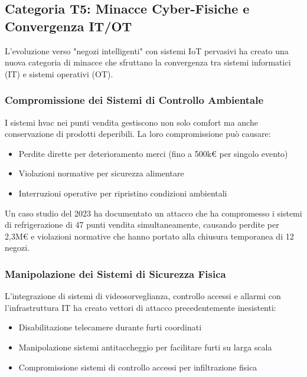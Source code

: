 \subsection{\texorpdfstring{Categoria T5: Minacce Cyber-Fisiche e Convergenza IT/OT}{2.2.6 - Categoria T5: Minacce Cyber-Fisiche e Convergenza IT/OT}}
\label{subsec:2.2.6_t5}

L'evoluzione verso "negozi intelligenti" con sistemi IoT pervasivi ha creato una nuova categoria di minacce che sfruttano la convergenza tra sistemi informatici (IT) e sistemi operativi (OT).

\subsubsection{Compromissione dei Sistemi di Controllo Ambientale}

I sistemi \gls{hvac} nei punti vendita gestiscono non solo comfort ma anche conservazione di prodotti deperibili. La loro compromissione può causare:

\begin{itemize}
\item Perdite dirette per deterioramento merci (fino a 500k€ per singolo evento)
\item Violazioni normative per sicurezza alimentare
\item Interruzioni operative per ripristino condizioni ambientali
\end{itemize}

Un caso studio del 2023 ha documentato un attacco che ha compromesso i sistemi di refrigerazione di 47 punti vendita simultaneamente, causando perdite per 2,3M€ e violazioni normative che hanno portato alla chiusura temporanea di 12 negozi.

\subsubsection{Manipolazione dei Sistemi di Sicurezza Fisica}

L'integrazione di sistemi di videosorveglianza, controllo accessi e allarmi con l'infrastruttura IT ha creato vettori di attacco precedentemente inesistenti:

\begin{itemize}
\item Disabilitazione telecamere durante furti coordinati
\item Manipolazione sistemi antitaccheggio per facilitare furti su larga scala
\item Compromissione sistemi di controllo accessi per infiltrazione fisica
\end{itemize}

